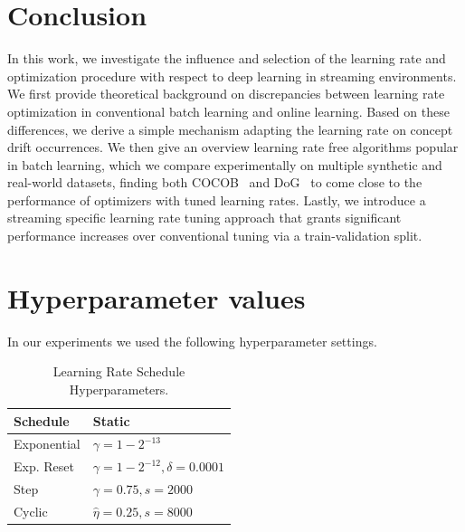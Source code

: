 \documentclass[letterpaper]{article} %
\begin{document}


\section{Conclusion}

In this work, we investigate the influence and selection of the learning rate and optimization procedure with respect to deep learning in streaming environments.
We first provide theoretical background on discrepancies between learning rate optimization in conventional batch learning and online learning.
Based on these differences, we derive a simple mechanism adapting the learning rate on concept drift occurrences.
We then give an overview learning rate free algorithms popular in batch learning, which we compare experimentally on multiple synthetic and real-world datasets,
finding both COCOB~\cite{orabonaTrainingDeepNetworks2017} and DoG~\cite{ivgiDoGSGDBest2023} to come close to the performance of optimizers with tuned learning rates.
Lastly, we introduce a streaming specific learning rate tuning approach that grants significant performance increases over conventional tuning via a train-validation split.



\newpage
\appendix

\section{Hyperparameter values}\label{app:hyperparams}

In our experiments we used the following hyperparameter settings.

\begin{table}[H]
	\centering
	\begin{tabular}{ll}
		\toprule
		Schedule    & Static                            \\ \midrule
		Exponential & $\gamma=1-2^{-13}$                \\
		Exp. Reset  & $\gamma=1-2^{-12}, \delta=0.0001$ \\
		Step        & $\gamma=0.75, s=2000$             \\
		Cyclic      & $\hat{\eta}=0.25, s=8000$         \\ \bottomrule
	\end{tabular}
	\caption{Learning Rate Schedule Hyperparameters.}
\end{table}
\end{document}
